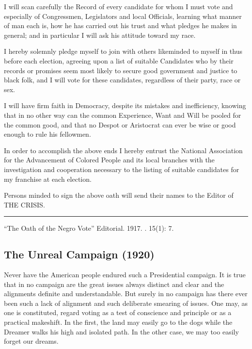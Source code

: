 \documentclass[letterpaper,10pt,english]{jupyterBook}
\begin{document}
\sphinxAtStartPar
I will scan carefully the Record of every candidate for whom I must vote and especially of Congressmen, Legislators and local Officials, learning what manner of man each is, how he has carried out his trust and what pledges he makes in general; and in particular I will ask his attitude toward my race.

\sphinxAtStartPar
I hereby solemnly pledge myself to join with others like\sphinxhyphen{}minded to myself in thus before each election, agreeing upon a list of suitable Candidates who by their records or promises seem most likely to secure good government and justice to black folk, and I will vote for these candidates, regardless of their party, race or sex.

\sphinxAtStartPar
I will have firm faith in Democracy, despite its mistakes and inefficiency, knowing that in no other way can the common Experience, Want and Will be pooled for the common good, and that no Despot or Aristocrat can ever be wise or good enough to rule his fellowmen.

\sphinxAtStartPar
In order to accomplish the above ends I hereby entrust the National Association for the Advancement of Colored People and its local branches with the investigation and co\sphinxhyphen{}operation necessary to the listing of suitable candidates for my franchise at each election.

\sphinxAtStartPar
Persons minded to sign the above oath will send their names to the Editor of THE CRISIS.


\bigskip\hrule\bigskip


\sphinxAtStartPar
{} “The Oath of the Negro Vote” Editorial. 1917. . 15(1): 7.


\subsection{The Unreal Campaign (1920)}
\label{\detokenize{Volumes/21/02/unreal_campaign:the-unreal-campaign-1920}}\label{\detokenize{Volumes/21/02/unreal_campaign::doc}}
\sphinxAtStartPar
Never have the American people endured such a Presidential campaign. It is true that in no campaign are the great issues always distinct and clear and the alignments definite and understandable. But surely in no campaign has there ever been such a lack of alignment and such deliberate smearing of issues. One may, as one is constituted, regard voting as a test of conscience and principle or as a practical make\sphinxhyphen{}shift. In the first, the land may easily go to the dogs while the Dreamer walks his high and isolated path. In the other case, we may too easily forget our dreams.
\end{document}
